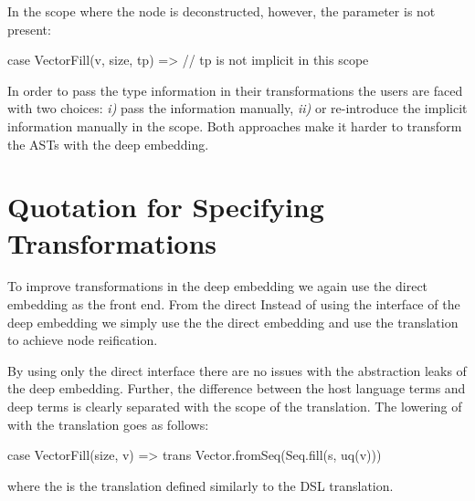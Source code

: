 In the scope where the node is deconstructed, however, the parameter is not present: \begin{lstparagraph}
case VectorFill(v, size, tp) => // tp is not implicit in this scope
\end{lstparagraph}

In order to pass the type information in their transformations the users are faced with
 two choices: \emph{i)} pass the information manually, \emph{ii)} or re-introduce the implicit
 information manually in the scope. Both approaches make it harder to transform
 the ASTs with the deep embedding.

\section{Quotation for Specifying Transformations}
\label{sec:yy-as-quotation}

To improve transformations in the deep embedding we again use the direct embedding
 as the front end. From the direct Instead of using the interface of the deep embedding we simply use the the direct
 embedding and use the translation to achieve node reification.

By using only the direct interface there are no issues with the abstraction leaks of the deep embedding.
Further, the difference between the host language terms and deep terms is clearly separated with the scope of
the translation. The lowering of  with the translation goes as follows:\begin{lstparagraph}
case VectorFill(size, v) => trans {
  Vector.fromSeq(Seq.fill(s, uq(v)))
}
\end{lstparagraph}
where the  is the translation defined similarly to the DSL translation.


